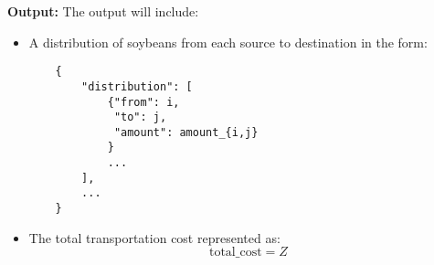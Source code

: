 \documentclass{article}
\begin{document}
\textbf{Output:}
The output will include:
\begin{itemize}
    \item A distribution of soybeans from each source to destination in the form:
    \begin{verbatim}
    {
        "distribution": [
            {"from": i,
             "to": j,
             "amount": amount_{i,j}
            }
            ... 
        ],
        ...
    }
    \end{verbatim}
    \item The total transportation cost represented as:
    \begin{equation}
    \text{total\_cost} = Z
    \end{equation}
\end{itemize}
\end{document}
